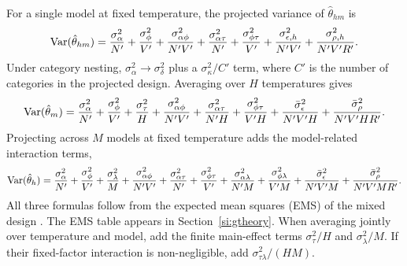 For a single model at fixed temperature, the projected variance of $\hat{\theta}_{hm}$ is
\begin{equation}
\operatorname{Var}(\hat{\theta}_{hm}) = \frac{\sigma^2_\alpha}{N'} + \frac{\sigma^2_\phi}{V'} + \frac{\sigma^2_{\alpha\phi}}{N'V'} + \frac{\sigma^2_{\alpha\tau}}{N'} + \frac{\sigma^2_{\phi\tau}}{V'} + \frac{\sigma^2_{\epsilon,h}}{N'V'} + \frac{\sigma^2_{\rho,h}}{N'V'R'}.
\end{equation}
Under category nesting, $\sigma^2_\alpha \to \sigma^2_\delta$ plus a $\sigma^2_\kappa/C'$ term, where $C'$ is the number of categories in the projected design. Averaging over $H$ temperatures gives
\begin{equation}
\operatorname{Var}(\hat{\theta}_m) = \frac{\sigma^2_\alpha}{N'} + \frac{\sigma^2_\phi}{V'} + \frac{\sigma^2_\tau}{H} + \frac{\sigma^2_{\alpha\phi}}{N'V'} + \frac{\sigma^2_{\alpha\tau}}{N'H} + \frac{\sigma^2_{\phi\tau}}{V'H} + \frac{\bar{\sigma}^2_\epsilon}{N'V'H} + \frac{\bar{\sigma}^2_\rho}{N'V'HR'}.
\end{equation}
Projecting across $M$ models at fixed temperature adds the model-related interaction terms,
\begin{equation}
\operatorname{Var}(\hat{\theta}_h) = \frac{\sigma^2_\alpha}{N'} + \frac{\sigma^2_\phi}{V'} + \frac{\sigma^2_\lambda}{M} + \frac{\sigma^2_{\alpha\phi}}{N'V'} + \frac{\sigma^2_{\alpha\tau}}{N'} + \frac{\sigma^2_{\phi\tau}}{V'} + \frac{\sigma^2_{\alpha\lambda}}{N'M} + \frac{\sigma^2_{\phi\lambda}}{V'M} + \frac{\bar{\sigma}^2_\epsilon}{N'V'M} + \frac{\bar{\sigma}^2_\rho}{N'V'MR'}.
\end{equation}
All three formulas follow from the expected mean squares (EMS) of the mixed design \citep[ch.~9]{brennan2001gtheory}. The EMS table appears in Section~\ref{si:gtheory}.
When averaging jointly over temperature and model, add the finite main-effect terms $\sigma^2_\tau/H$ and $\sigma^2_\lambda/M$. If their fixed-factor interaction is non-negligible, add $\sigma^2_{\tau\lambda}/(HM)$.

